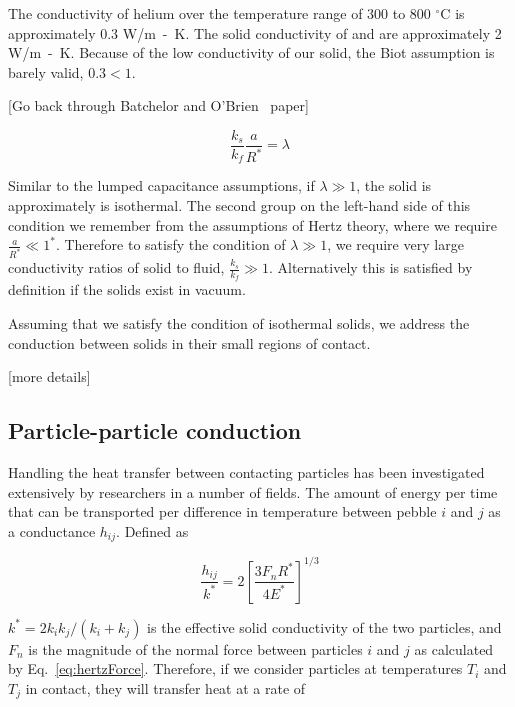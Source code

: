 The conductivity of helium over the temperature range of 300 to 800 $^\circ$C is approximately 0.3 \si{W/m-K}. The solid conductivity of \lit and \lis are approximately 2 \si{W/m-K}. Because of the low conductivity of our solid, the Biot assumption is barely valid, $0.3 < 1$. 

[Go back through Batchelor and O'Brien~\cite{Batchelor1977} paper]

\begin{equation}
	\frac{ k_s }{ k_f } \frac{a}{R^*} = \lambda
\end{equation}

Similar to the lumped capacitance assumptions, if $\lambda \gg 1$, the solid is approximately is isothermal. The second group on the left-hand side of this condition we remember from the assumptions of Hertz theory, where we require $\frac{a}{R^*} \ll 1^*$. Therefore to satisfy the condition of $\lambda \gg 1$, we require very large conductivity ratios of solid to fluid, $\frac{k_s}{k_f} \gg 1$. Alternatively this is satisfied by definition if the solids exist in vacuum.

Assuming that we satisfy the condition of isothermal solids, we address the conduction between solids in their small regions of contact.

[more details]










\subsection{Particle-particle conduction}

Handling the heat transfer between contacting particles has been investigated extensively by researchers in a number of fields\cite{Zhou2009,Zhang2011,Wu2011,Vargas2001,Li2000,Chaudhuri2006}. The amount of energy per time that can be transported per difference in temperature between pebble $i$ and $j$ as a conductance $h_{ij}$. Defined as

\begin{equation}\label{eq:pebble-conductance}
	\frac{h_{ij}}{k^*}= 2\left[\frac{3F_nR^*}{4E^*}\right]^{1/3}
\end{equation}

$k^*= 2k_ik_j/(k_i+k_j)$ is the effective solid conductivity of the two particles, and $F_n$ is the magnitude of the normal force between particles $i$ and $j$ as calculated by Eq.~\ref{eq:hertzForce}. Therefore, if we consider particles at temperatures $T_i$ and $T_j$ in contact, they will transfer heat at a rate of

